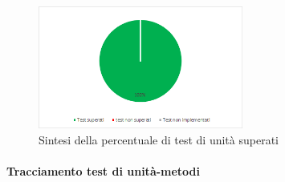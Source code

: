     \begin{figure}[H]
    	\centering 
    	\includegraphics[width=0.6\textwidth]{Images/TU.png}
    	\caption{Sintesi della percentuale di test di unità superati}
    	\label{TUZ} 
    \end{figure}
    
    \paragraph{Tracciamento test di unità-metodi} \mbox{}
    

